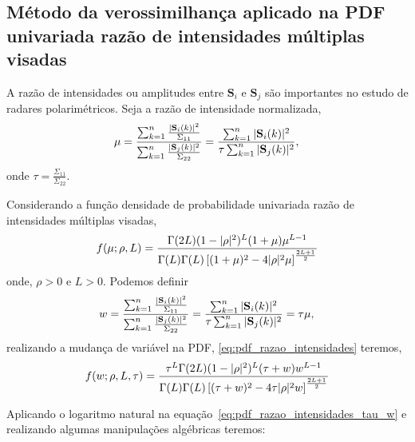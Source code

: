 \subsection{Método da verossimilhança aplicado na PDF univariada razão de intensidades múltiplas visadas}
A razão de intensidades ou amplitudes entre $\mathbf{S}_i$ e $\mathbf{S}_j$ são importantes no estudo de radares polarimétricos. Seja a razão de intensidade normalizada,
\begin{equation}\label{eq:razao_intensidades}
 \mu=\frac{\sum_{k=1}^{n}\frac{|\mathbf{S}_i(k)|^2}{\Sigma_{11}}}{\sum_{k=1}^{n}\frac{|\mathbf{S}_j(k)|^2}{\Sigma_{22}}}=\frac{\sum_{k=1}^{n}|\mathbf{S}_i(k)|^2}{\tau\sum_{k=1}^{n}|\mathbf{S}_j(k)|^2},\\
\end{equation}
onde $\tau=\frac{\Sigma_{11}}{\Sigma_{22}}$.
  
Considerando a função densidade de probabilidade univariada razão de intensidades múltiplas visadas,
\begin{equation}\label{eq:pdf_razao_intensidades}
	f(\mu;\rho,L)=\frac{\Gamma(2L)(1-|\rho|^2)^{L}(1+\mu)\mu^{L-1}}{\Gamma(L)\Gamma(L)\left[(1+\mu)^2-4|\rho|^2\mu \right]^{\frac{2L+1}{2}}}\\
\end{equation}
onde, $\rho>0$ e $L>0$. 
Podemos definir 
\begin{equation}\label{eq:razao_intensidades_w}
 w=\frac{\sum_{k=1}^{n}\frac{|\mathbf{S}_i(k)|^2}{\Sigma_{11}}}{\sum_{k=1}^{n}\frac{|\mathbf{S}_j(k)|^2}{\Sigma_{22}}}=\frac{\sum_{k=1}^{n}|\mathbf{S}_i(k)|^2}{\tau\sum_{k=1}^{n}|\mathbf{S}_j(k)|^2}=\tau \mu,\\ 
\end{equation}
realizando a mudança de variável na PDF, \eqref{eq:pdf_razao_intensidades} teremos, 
\begin{equation}\label{eq:pdf_razao_intensidades_tau_w}
	f(w;\rho,L,\tau)=\frac{\tau^L\Gamma(2L)(1-|\rho|^2)^{L}(\tau+w)w^{L-1}}{\Gamma(L)\Gamma(L)\left[(\tau+w)^2-4\tau|\rho|^2w \right]^{\frac{2L+1}{2}}}\\
\end{equation}

Aplicando o logaritmo natural na equação~\eqref{eq:pdf_razao_intensidades_tau_w} e realizando algumas manipulações algébricas teremos:

